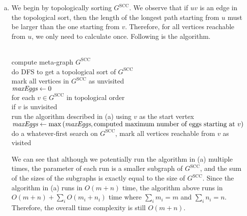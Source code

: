 \documentclass[11pt]{article}
\begin{document}
\begin{solution}
\begin{enumerate}[(a)]
\item We begin by topologically sorting $G^{\text{SCC}}$. We observe that if $uv$ is an edge in the topological sort, then the length of the longest path starting from $u$ must be larger than the one starting from $v$. Therefore, for all vertices reachable from $u$, we only need to calculate once. Following is the algorithm.
\begin{algo}
	\textsc{}\+
\\	compute meta-graph $G^{\text{SCC}}$
\\	do DFS to get a topological sort of $G^{\text{SCC}}$
\\	mark all vertices in $G^{\text{SCC}}$ as unvisited
\\	$\emph{maxEggs}\gets 0$
\\	for each $v\in G^{\text{SCC}}$ in topological order\+
\\	if $v$ is unvisited\+
\\	run the algorithm described in (a) using $v$ as the start vertex
\\	$\emph{maxEggs}\gets \max{(\emph{maxEggs}, \text{computed maximum number of eggs starting at $v$})}$
\\	do a whatever-first search on $G^{\text{SCC}}$, mark all vertices reachable from $v$ as visited
\end{algo}
We can see that although we potentially run the algorithm in (a) multiple times, the parameter of each run is a smaller subgraph of $G^{\text{SCC}}$, and the sum of the sizes of the subgraphs is exactly equal to the size of $G^{\text{SCC}}$. Since the algorithm in (a) runs in $O(m+n)$ time, the algorithm above runs in $O(m+n)+\sum_{i}{O(m_i+n_i)}$ time where $\sum_{i}{m_i}=m$ and $\sum_{i}{n_i}=n$. Therefore, the overall time complexity is still $O(m+n)$.


\end{enumerate}
\end{solution}
\end{document}
